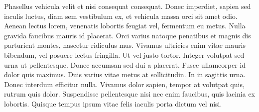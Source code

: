 \begin{resumo}

Phasellus vehicula velit et nisi consequat consequat. Donec imperdiet, sapien sed iaculis luctus, diam sem vestibulum ex, et vehicula massa orci sit amet odio. Aenean lectus lorem, venenatis lobortis feugiat vel, fermentum eu metus. Nulla gravida faucibus mauris id placerat. Orci varius natoque penatibus et magnis dis parturient montes, nascetur ridiculus mus. Vivamus ultricies enim vitae mauris bibendum, vel posuere lectus fringilla. Ut vel justo tortor. Integer volutpat sed urna ut pellentesque. Donec accumsan sed dui a placerat. Fusce ullamcorper id dolor quis maximus. Duis varius vitae metus at sollicitudin. In in sagittis urna. Donec interdum efficitur nulla. Vivamus dolor sapien, tempor at volutpat quis, rutrum quis dolor. Suspendisse pellentesque nisi nec enim faucibus, quis lacinia ex lobortis. Quisque tempus ipsum vitae felis iaculis porta dictum vel nisi.

\end{resumo}

